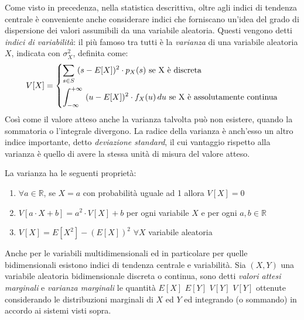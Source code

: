 \documentclass[a4paper,12pt, oneside]{book}
\newcommand{\numberset}{\mathbb}
\newcommand{\R}{\numberset{R}}
\begin{document}
Come visto in precedenza, nella statistica descrittiva, oltre agli indici di tendenza centrale è conveniente 
anche considerare indici che forniscano un'idea del grado di dispersione dei valori 
assumibili da una variabile aleatoria.\newline
Questi vengono detti \emph{indici di variabilità}: il più famoso tra tutti è la \emph{varianza}
di una variabile aleatoria $X$, indicata con $\sigma_X ^ 2$, definita come:
\[V[X] = \begin{dcases}
            \sum_{s \in S}\,\, (s - E[X])^2 \cdot p_X(s)\mbox{ se X è discreta}\\
            \int_{-\infty}^{+\infty}\,\, (u - E[X])^2 \cdot f_X(u)\,du\mbox{ se X è assolutamente continua}\\
         \end{dcases}\]
Così come il valore atteso anche la varianza talvolta può non esistere, quando la sommatoria o l'integrale divergono.\newline
La radice della varianza è anch'esso un altro indice importante, detto \emph{deviazione standard}, il cui
vantaggio rispetto alla varianza è quello di avere la stessa unità di misura del valore atteso.

La varianza ha le seguenti proprietà:
\begin{enumerate}
    \item $\forall a \in \R$, se $X = a$ con probabilità uguale ad 1 allora $V[X] = 0$
    \item $V[a\cdot X + b] = a^2 \cdot V[X] + b$ per ogni variabile $X$ e per ogni $a,b \in \R$
    \item $V[X] = E[X^2] - (E[X])^2\,\,\forall X$ variabile aleatoria
\end{enumerate}
Anche per le variabili multidimensionali ed in particolare per quelle bidimensionali 
esistono indici di tendenza centrale e variabilità.\newline
Sia $(X, Y)$ una variabile aleatoria bidimensionale discreta o continua, sono detti \emph{valori attesi marginali} 
e \emph{varianza marginali }le quantità $E[X]\,\,E[Y]\,\,V[Y]\,\,V[Y]$
ottenute considerando le distribuzioni marginali di $X$ ed $Y $ ed integrando (o sommando) in accordo ai sistemi visti sopra.
\end{document}
